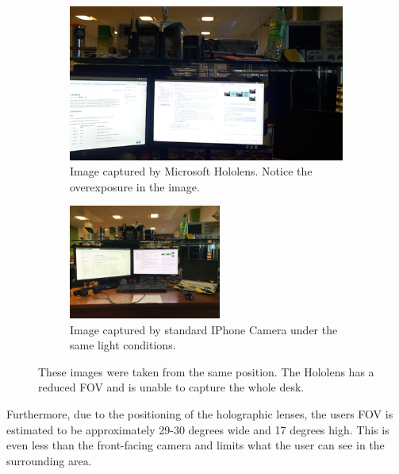 \begin{figure}[ht]
    \begin{subfigure}[b]{.45\textwidth}
        \centering
        \includegraphics[width=1.0\linewidth]{img/chapter5_implementation/hololensFOV.jpeg}
        \caption{Image captured by Microsoft Hololens. Notice the overexposure in the image.}
    \end{subfigure}%
    \hspace{\fill} 
    \begin{subfigure}[b]{.45\textwidth}
        \centering
        \includegraphics[width=1.0\linewidth,height=37.5mm]{img/chapter5_implementation/hololensFOVIphone.jpg}
        \caption{Image captured by standard IPhone Camera under the same light conditions.}
    \end{subfigure}
    \vspace{-1\baselineskip}
    \begin{center}
        \caption{These images were taken from the same position. The Hololens has a reduced FOV and is unable to capture the whole desk.}
        \label{fig:holoVsIphone}
    \end{center}
    \vspace{-2\baselineskip}
\end{figure}

Furthermore, due to the positioning of the holographic lenses, the users FOV is estimated to be approximately 29-30 degrees wide and 17 degrees high. This is even less than the front-facing camera and limits what the user can see in the surrounding area.

